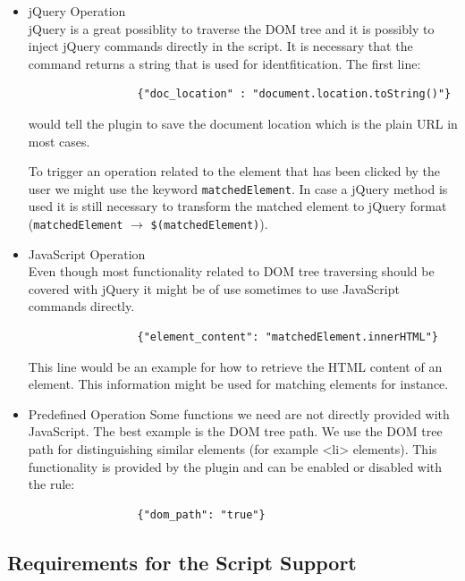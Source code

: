 \begin{itemize}

	\item jQuery Operation \\ 
	jQuery is a great possiblity to traverse the DOM tree and it is possibly to inject  jQuery commands directly in the script. It is necessary that the command returns a string that is used for identfitication. The first line:
		\begin{verbatim}
		         {"doc_location" : "document.location.toString()"}
		\end{verbatim}
	would tell the plugin to save the document location which is the plain URL in most cases. 
	
	To trigger an operation related to the element that has been clicked by the user we might use the keyword \verb^matchedElement^. In case a jQuery method is used it is still necessary to transform the matched element to jQuery format (\verb^matchedElement^ $\rightarrow$ \verb^$(matchedElement)^). 
	
	\item	 JavaScript Operation \\
	Even though most functionality related to DOM tree traversing should be covered with jQuery it might be of use sometimes to use JavaScript commands directly. 
		\begin{verbatim}
		         {"element_content": "matchedElement.innerHTML"}
		\end{verbatim}
	This line would be an example for how to retrieve the HTML content of an element. This information might be used for matching elements for instance. 
	
	\item Predefined Operation
	Some functions we need are not directly provided with JavaScript. The best example is the DOM tree path. We use the DOM tree path for distinguishing similar elements (for example <li> elements). This functionality is provided by the plugin and can be enabled or disabled with the rule:
		\begin{verbatim}
		         {"dom_path": "true"}
		\end{verbatim}
	
		
	
\end{itemize}


\subsection{Requirements for the Script Support}

